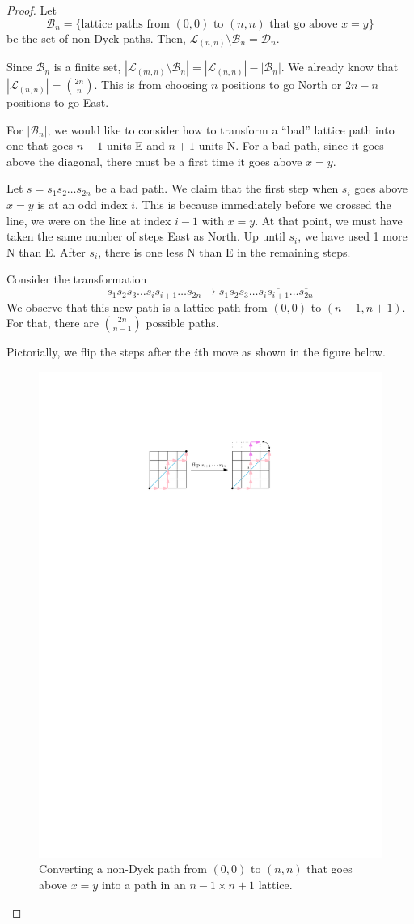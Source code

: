 \begin{proof}
    Let
    $$
    \mathcal{B}_{n} = \{ \text{lattice paths from $(0,0)$ to $(n,n)$ that go above $x=y$} \}
    $$
    be the set of non-Dyck paths. Then, $\mathcal{L}_{(n,n)} \setminus \mathcal{B}_n = \mathcal{D}_n$.

    Since $\mathcal{B}_n$ is a finite set, $|\mathcal{L}_{(m,n)} \setminus \mathcal{B}_n| = |\mathcal{L}_{(n,n)}| - |\mathcal{B}_n|$. We already know that $|\mathcal{L}_{(n,n)}| = \binom{2n}{n}$. This is from choosing $n$ positions to go North or $2n-n$ positions to go East.

    For $|\mathcal{B}_n|$, we would like to consider how to transform a ``bad'' lattice path into one that goes $n-1$ units E and $n+1$ units N. For a bad path, since it goes above the diagonal, there must be a first time it goes above $x=y$.

    Let $s = s_1s_2\ldots s_{2n}$ be a bad path. We claim that the first step when $s_i$ goes above $x=y$ is at an odd index $i$. This is because immediately before we crossed the line, we were on the line at index $i-1$ with $x=y$. At that point, we must have taken the same number of steps East as North. Up until $s_i$, we have used 1 more N than E. After $s_i$, there is one less N than E in the remaining steps.

    Consider the transformation 
    $$
    s_1s_2s_3\ldots s_i s_{i+1} \ldots s_{2n} \to s_1s_2s_3 \ldots s_i \overline{s_{i+1}} \ldots \overline{s_{2n}}
    $$
    We observe that this new path is a lattice path from $(0,0)$ to $(n-1,n+1)$. For that, there are $\binom{2n}{n-1}$ possible paths.

    Pictorially, we flip the steps after the $i$th move as shown in the figure below.

    \begin{figure}[htbp]
        \centering
        \includegraphics[width=0.5\linewidth]{figures/catalan-number-proof.pdf}
        \caption{Converting a non-Dyck path from $(0,0)$ to $(n,n)$ that goes above $x=y$ into a path in an $n-1 \times n+1$ lattice.}
        \label{fig:catalan-number-proof}
    \end{figure}
\end{proof}

